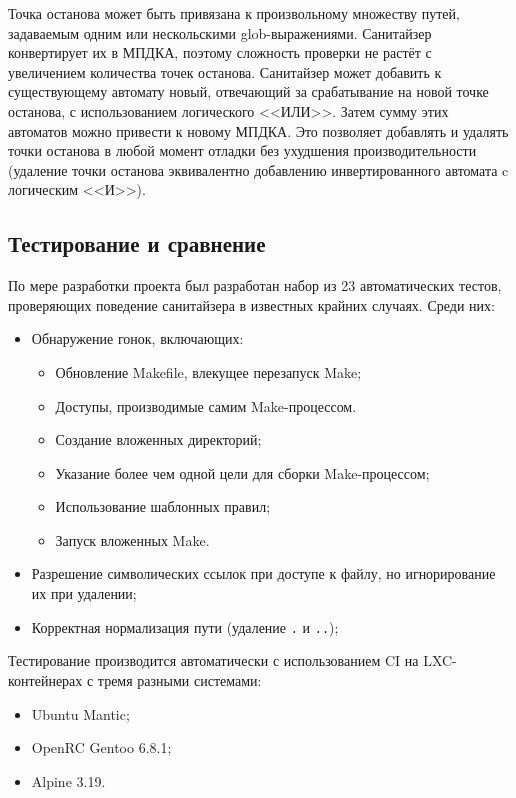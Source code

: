 Точка останова может быть привязана к произвольному множеству путей, задаваемым одним или нескольскими glob-выражениями. Санитайзер конвертирует их в МПДКА, поэтому сложность проверки не растёт с увеличением количества точек останова. Санитайзер может добавить к существующему автомату новый, отвечающий за срабатывание на новой точке останова, с использованием логического <<ИЛИ>>. Затем сумму этих автоматов можно привести к новому МПДКА. Это позволяет добавлять и удалять точки останова в любой момент отладки без ухудшения производительности (удаление точки останова эквивалентно добавлению инвертированного автомата c логическим <<И>>).

\subsection{Тестирование и сравнение}
\label{subsec:testing}

По мере разработки проекта был разработан набор из 23 автоматических тестов, проверяющих поведение санитайзера в известных крайних случаях. Среди них:

\begin{itemize}
    \item Обнаружение гонок, включающих:
    \begin{itemize}
        \item Обновление Makefile, влекущее перезапуск Make;
        \item Доступы, производимые самим Make-процессом.
        \item Создание вложенных директорий;
        \item Указание более чем одной цели для сборки Make-процессом;
        \item Использование шаблонных правил;
        \item Запуск вложенных Make.
    \end{itemize}
    \item Разрешение символических ссылок при доступе к файлу, но игнорирование их при удалении;
    \item Корректная нормализация пути (удаление \texttt{.} и \texttt{..});
\end{itemize}

Тестирование производится автоматически с использованием CI на LXC-контейнерах с тремя разными системами:

\begin{itemize}
    \item Ubuntu Mantic;
    \item OpenRC Gentoo 6.8.1;
    \item Alpine 3.19.
\end{itemize}

